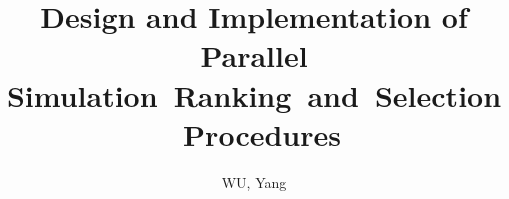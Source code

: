 \title{Design and Implementation of Parallel Simulation~Ranking~and~Selection~Procedures}
\author{WU, Yang}

\titlepge
